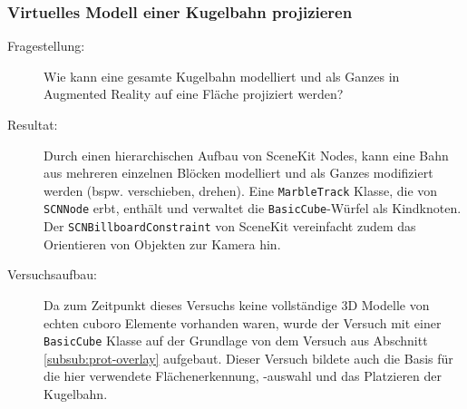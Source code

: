 \subsubsection{Virtuelles Modell einer Kugelbahn projizieren}\label{subsub:prot-kugelbahn}
\begin{description}
	\item[Fragestellung:] Wie kann eine gesamte Kugelbahn modelliert und als Ganzes in Augmented Reality auf eine Fläche projiziert werden?
	\item[Resultat:] Durch einen hierarchischen Aufbau von SceneKit Nodes, kann eine Bahn aus mehreren einzelnen Blöcken modelliert und als Ganzes modifiziert werden (bspw. verschieben, drehen). Eine \texttt{MarbleTrack} Klasse, die von \texttt{SCNNode} erbt, enthält und verwaltet die \texttt{BasicCube}-Würfel als Kindknoten. Der \texttt{SCNBillboardConstraint} von SceneKit vereinfacht zudem das Orientieren von Objekten zur Kamera hin. %
	\item[Versuchsaufbau:] Da zum Zeitpunkt dieses Versuchs keine vollständige 3D Modelle von echten cuboro Elemente vorhanden waren, wurde der Versuch mit einer \texttt{BasicCube} Klasse auf der Grundlage von dem Versuch aus Abschnitt \ref{subsub:prot-overlay} aufgebaut. Dieser Versuch bildete auch die Basis für die hier verwendete Flächenerkennung, -auswahl und das Platzieren der Kugelbahn.


\end{description}
